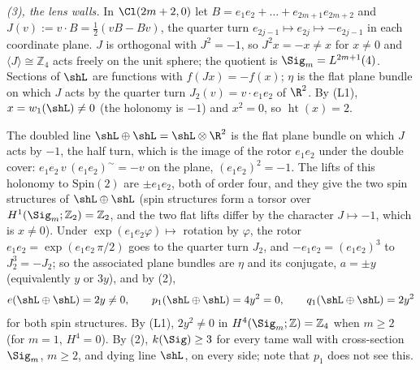 \emph{(3), the lens walls.} In $\Cl(2m+2, 0)$ let $B = e_{1}e_{2} + \dots + e_{2m+1}e_{2m+2}$ and $J(v) := v \cdot B = \tfrac12 (vB - Bv)$, the quarter turn $e_{2j-1} \mapsto e_{2j} \mapsto -e_{2j-1}$ in each coordinate plane. $J$ is orthogonal with $J^{2} = -1$, so $J^{2}x = -x \neq x$ for $x \neq 0$ and $\langle J \rangle \cong \mathbb{Z}_{4}$ acts freely on the unit sphere; the quotient is $\Sig_{m} = L^{2m+1}(4)$. Sections of $\shL$ are functions with $f(Jx) = -f(x)$; $\eta$ is the flat plane bundle on which $J$ acts by the quarter turn $J_{2}(v) = v \cdot e_{1}e_{2}$ of $\R^{2}$. By (L1), $x = w_{1}(\shL) \neq 0$ (the holonomy is $-1$) and $x^{2} = 0$, so $\operatorname{ht}(x) = 2$.

The doubled line $\shL \oplus \shL = \shL \otimes \R^{2}$ is the flat plane bundle on which $J$ acts by $-1$, the half turn, which is the image of the rotor $e_{1}e_{2}$ under the double cover: $e_{1}e_{2}\, v\, (e_{1}e_{2})^{\sim} = -v$ on the plane, $(e_{1}e_{2})^{2} = -1$. The lifts of this holonomy to $\mathrm{Spin}(2)$ are $\pm e_{1}e_{2}$, both of order four, and they give the two spin structures of $\shL \oplus \shL$ (spin structures form a torsor over $H^{1}(\Sig_{m}; \mathbb{Z}_{2}) = \mathbb{Z}_{2}$, and the two flat lifts differ by the character $J \mapsto -1$, which is $x \neq 0$). Under $\exp(e_{1}e_{2}\varphi) \mapsto$ rotation by $\varphi$, the rotor $e_{1}e_{2} = \exp(e_{1}e_{2}\,\pi/2)$ goes to the quarter turn $J_{2}$, and $-e_{1}e_{2} = (e_{1}e_{2})^{3}$ to $J_{2}^{3} = -J_{2}$; so the associated plane bundles are $\eta$ and its conjugate, $a = \pm y$ (equivalently $y$ or $3y$), and by (2),
\[
e(\shL \oplus \shL) = 2y \neq 0, \qquad p_{1}(\shL \oplus \shL) = 4y^{2} = 0, \qquad q_{1}(\shL \oplus \shL) = 2y^{2}
\]
for both spin structures. By (L1), $2y^{2} \neq 0$ in $H^{4}(\Sig_{m}; \mathbb{Z}) = \mathbb{Z}_{4}$ when $m \geq 2$ (for $m = 1$, $H^{4} = 0$). By (2), $k(\Sig) \geq 3$ for every tame wall with cross-section $\Sig_{m}$, $m \geq 2$, and dying line $\shL$, on every side; note that $p_{1}$ does not see this.

